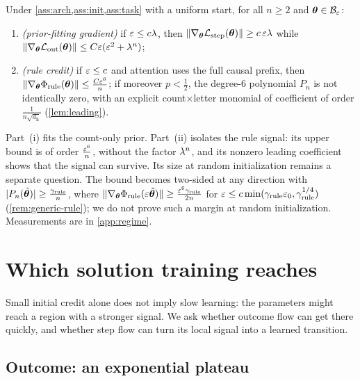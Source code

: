 \begin{theorem}
\label{thm:separation}
Under \cref{ass:arch,ass:init,ass:task} with a uniform start, for all $n\ge2$ and $\bm\theta\in\mathcal B_{\varepsilon}$:
\begin{enumerate}[label=(\roman*),leftmargin=*,itemsep=0pt,topsep=2pt]
\item \emph{(prior-fitting gradient)} if $\varepsilon\le c\lambda$, then $\|\nabla_{\bm\theta}\mathcal L_{\mathrm{step}}(\bm\theta)\|\ge c\,\varepsilon\lambda$ while
$\|\nabla_{\bm\theta}\mathcal L_{\mathrm{out}}(\bm\theta)\|\le C\varepsilon(\varepsilon^2+\lambda^n)$;
\item \emph{(rule credit)} if $\varepsilon\le c$ and attention uses the full causal prefix, then $\|\nabla_{\bm\theta}\Phi_{\mathrm{rule}}(\bm\theta)\|\le \frac{C\varepsilon^6}{n}$; if
moreover $p<\tfrac{1}{2}$, the degree-$6$ polynomial $P_n$ is not identically zero, with an explicit count$\times$letter monomial of
coefficient of order $\frac{1}{n\sqrt{d_{\mathrm h}}}$
(\cref{lem:leading}).
\end{enumerate}
\end{theorem}

Part~(i) fits the count-only prior. Part~(ii) isolates the rule signal: its upper bound is of order $\frac{\varepsilon^6}{n}$, without
the factor $\lambda^n$, and its nonzero leading coefficient shows that the signal can survive. Its size at random initialization
remains a separate question. The bound becomes two-sided at any direction with
$|P_n(\tilde{\bm\theta})|\ge\frac{\gamma_{\mathrm{rule}}}{n}$, where $\|\nabla_{\bm\theta}\Phi_{\mathrm{rule}}(\varepsilon\tilde{\bm\theta})\|\ge\frac{\varepsilon^6\gamma_{\mathrm{rule}}}{2n}$ for
$\varepsilon\le c\min(\gamma_{\mathrm{rule}}\varepsilon_0,\gamma_{\mathrm{rule}}^{1/4})$ (\cref{rem:generic-rule}); we do not prove such a margin at random
initialization. Measurements are in \cref{app:regime}.

\section{Which solution training reaches}
\label{sec:reach}

Small initial credit alone does not imply slow learning: the parameters might reach a region with a stronger signal. We ask
whether outcome flow can get there quickly, and whether step flow can turn its local signal into a learned transition.

\subsection{Outcome: an exponential plateau}

